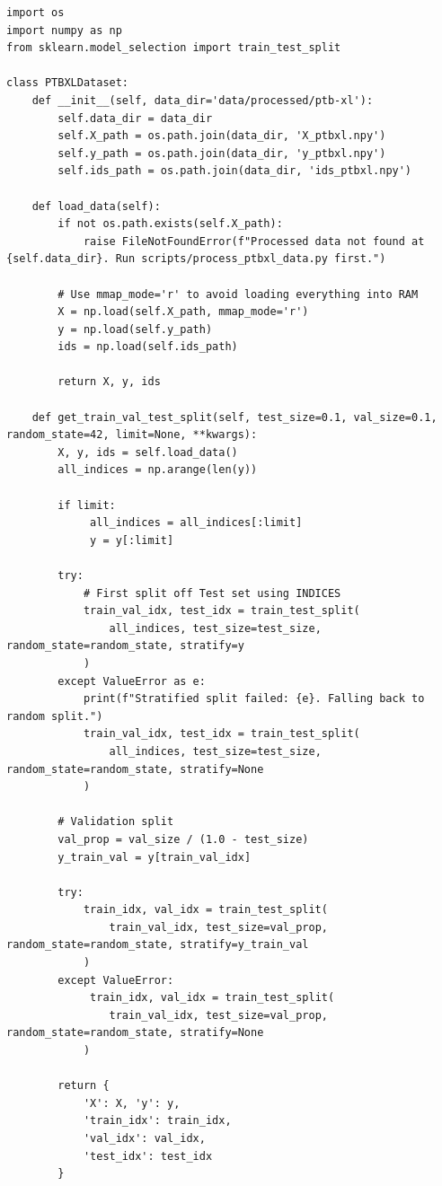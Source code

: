 \documentclass[12pt,a4paper]{report}
\begin{document}
\begin{lstlisting}[caption={PTB-XL Dataset Class and Train/Validation/Test Split Logic (src/ptbxl/loader.py)}]
import os
import numpy as np
from sklearn.model_selection import train_test_split

class PTBXLDataset:
    def __init__(self, data_dir='data/processed/ptb-xl'):
        self.data_dir = data_dir
        self.X_path = os.path.join(data_dir, 'X_ptbxl.npy')
        self.y_path = os.path.join(data_dir, 'y_ptbxl.npy')
        self.ids_path = os.path.join(data_dir, 'ids_ptbxl.npy')
        
    def load_data(self):
        if not os.path.exists(self.X_path):
            raise FileNotFoundError(f"Processed data not found at {self.data_dir}. Run scripts/process_ptbxl_data.py first.")
            
        # Use mmap_mode='r' to avoid loading everything into RAM
        X = np.load(self.X_path, mmap_mode='r')
        y = np.load(self.y_path)
        ids = np.load(self.ids_path)
        
        return X, y, ids
    
    def get_train_val_test_split(self, test_size=0.1, val_size=0.1, random_state=42, limit=None, **kwargs):
        X, y, ids = self.load_data()
        all_indices = np.arange(len(y))
        
        if limit:
             all_indices = all_indices[:limit]
             y = y[:limit]
        
        try:
            # First split off Test set using INDICES
            train_val_idx, test_idx = train_test_split(
                all_indices, test_size=test_size, random_state=random_state, stratify=y
            )
        except ValueError as e:
            print(f"Stratified split failed: {e}. Falling back to random split.")
            train_val_idx, test_idx = train_test_split(
                all_indices, test_size=test_size, random_state=random_state, stratify=None
            )
        
        # Validation split
        val_prop = val_size / (1.0 - test_size)
        y_train_val = y[train_val_idx]
        
        try:
            train_idx, val_idx = train_test_split(
                train_val_idx, test_size=val_prop, random_state=random_state, stratify=y_train_val
            )
        except ValueError:
             train_idx, val_idx = train_test_split(
                train_val_idx, test_size=val_prop, random_state=random_state, stratify=None
            )
        
        return {
            'X': X, 'y': y,
            'train_idx': train_idx,
            'val_idx': val_idx,
            'test_idx': test_idx
        }
\end{lstlisting}
\end{document}
